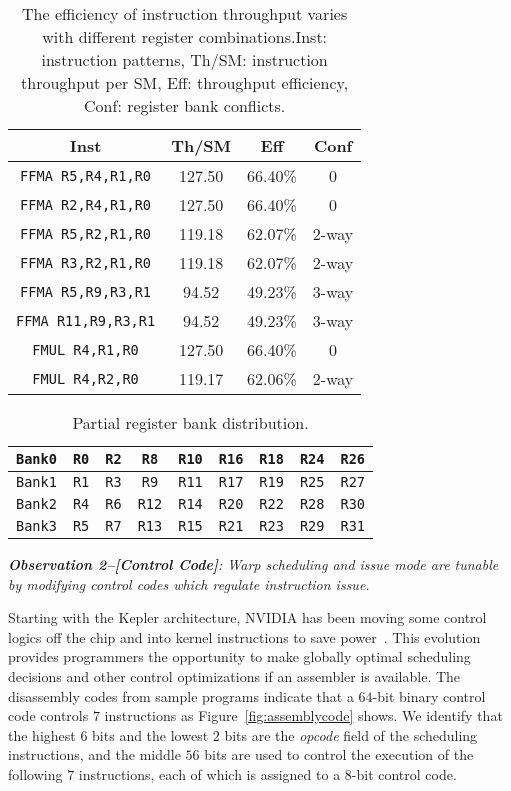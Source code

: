 \begin{table}[htbp]
    \caption{The efficiency of instruction throughput varies with different register combinations.Inst: instruction patterns, Th/SM: instruction throughput per SM, Eff: throughput efficiency,  Conf: register bank conflicts.}
\centering
\scalebox{0.8} {
\begin{tabular}{|c|c|c|c|}
\hline
Inst &Th/SM&Eff&Conf\\
\hline
{\tt FFMA R5,R4,R1,R0}&127.50&66.40\%&0\\
\hline
{\tt FFMA R2,R4,R1,R0}&127.50&66.40\%&0\\
\hline
{\tt FFMA R5,R2,R1,R0}&119.18&62.07\%&2-way\\
\hline
{\tt FFMA R3,R2,R1,R0}&119.18&62.07\%&2-way\\
\hline
{\tt FFMA R5,R9,R3,R1}&94.52&49.23\%&3-way\\
\hline
{\tt FFMA R11,R9,R3,R1}&94.52&49.23\%&3-way\\
\hline
{\tt FMUL R4,R1,R0}&127.50&66.40\%&0\\
\hline
{\tt FMUL R4,R2,R0}&119.17&62.06\%&2-way\\
\hline
\end{tabular}
}
\label{tab:th}
\end{table}


\begin{table}[htbp]
\caption{Partial register bank distribution.}
\centering
\scalebox{0.8} {
\begin{tabular}{|c|c|c|c|c|c|c|c|c|}
\hline
    {\tt Bank0}&{\tt R0}&{\tt R2}&{\tt R8}&{\tt R10}&{\tt R16}&{\tt R18}&{\tt R24}&{\tt R26}\\
\hline
    {\tt Bank1}&{\tt R1}&{\tt R3}&{\tt R9}&{\tt R11}&{\tt R17}&{\tt R19}&{\tt R25}&{\tt R27} \\
\hline
    {\tt Bank2}&{\tt R4}&{\tt R6}&{\tt R12}&{\tt R14}&{\tt R20}&{\tt R22}&{\tt R28}&{\tt R30}\\
\hline
    {\tt Bank3}&{\tt R5}&{\tt R7}&{\tt R13}&{\tt R15}&{\tt R21}&{\tt R23}&{\tt R29}&{\tt R31}\\
\hline
\end{tabular}
}
\label{tab:reg}
\end{table}


{\em {\bf Observation 2--[Control Code]}:
Warp scheduling and issue mode are tunable by modifying control codes which regulate instruction issue.}

Starting with the Kepler architecture, NVIDIA has been moving some control logics off the chip and into kernel
instructions to save power~\cite{lai,maxas}. 
This evolution provides programmers the opportunity to
make globally optimal scheduling decisions and other control optimizations if an assembler is available. 
The disassembly codes from sample programs indicate that a $64$-bit binary control code controls $7$ instructions as Figure~\ref{fig:assemblycode} shows.
We identify that the highest $6$ bits and the lowest $2$ bits are the {\em opcode} field of the scheduling instructions, and the middle $56$ bits are used to control the execution of the following $7$ instructions, each of which is assigned to a $8$-bit control code.



